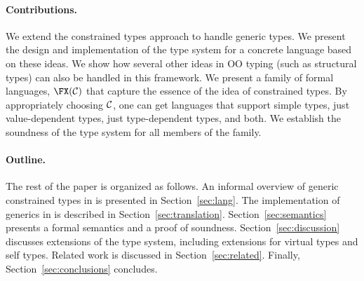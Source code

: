 \paragraph{Contributions.}
We extend the constrained types approach to handle generic types.  We
present the design and implementation of the type system for a
concrete language \Xten{} based on these ideas. We show how several
other ideas in OO typing (such as structural types) can also be
handled in this framework. We present a family of formal languages,
$\FX(\cal C)$ that capture the essence of the idea of constrained
types. By appropriately choosing $\cal C$, one can get languages that
support simple types, just value-dependent types, just type-dependent
types, and both. We establish the soundness of the type system for all
members of the family.

\paragraph{Outline.}

The rest of the paper is organized as follows.
%
An informal overview of generic constrained types in \Xten{}
is presented in
Section~\ref{sec:lang}.
%
The implementation of generics in \Xten{} is
described in Section~\ref{sec:translation}.
%
Section~\ref{sec:semantics} presents a formal semantics and a
proof of soundness.
%
Section~\ref{sec:discussion} discusses extensions of the type system,
including extensions for virtual types and self types.
%
Related work is discussed in Section~\ref{sec:related}.
%
Finally, Section~\ref{sec:conclusions} concludes.


